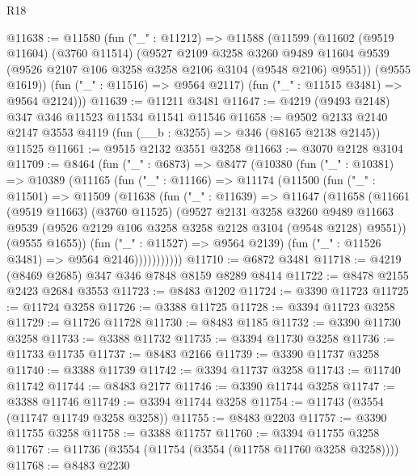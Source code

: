 \begin{lexlean}{R18}
\begin{coremodule}
@11638 := @11580
    (fun ("_" : @11212) =>
    @11588
      (@11599
        (@11602
          (@9519 @11604)
          (@3760 @11514)
          (@9527
            @2109
            @3258
            @3260
            @9489
            @11604
            @9539
            (@9526 @2107 @106 @3258 @3258 @2106 @3104 (@9548 @2106) @9551))
          (@9555 @1619))
        (fun ("_" : @11516) => @9564 @2117)
        (fun ("_" : @11515 @3481) => @9564 @2124)))
@11639 := @11211 @3481
@11647 := @4219 (@9493 @2148) @347 @346 @11523 @11534 @11541 @11546
@11658 := @9502 @2133 @2140 @2147 @3553 @4119 (fun (__b : @3255) => @346 (@8165 @2138 @2145)) @11525
@11661 := @9515 @2132 @3551 @3258
@11663 := @3070 @2128 @3104
@11709 := @8464
    (fun ("_" : @6873) =>
    @8477
      (@10380
        (fun ("_" : @10381) =>
        @10389
          (@11165
            (fun ("_" : @11166) =>
            @11174
              (@11500
                (fun ("_" : @11501) =>
                @11509
                  (@11638
                    (fun ("_" : @11639) =>
                    @11647
                      (@11658
                        (@11661
                          (@9519 @11663)
                          (@3760 @11525)
                          (@9527
                            @2131
                            @3258
                            @3260
                            @9489
                            @11663
                            @9539
                            (@9526 @2129 @106 @3258 @3258 @2128 @3104 (@9548 @2128) @9551))
                          (@9555 @1655))
                        (fun ("_" : @11527) => @9564 @2139)
                        (fun ("_" : @11526 @3481) => @9564 @2146)))))))))))
@11710 := @6872 @3481
@11718 := @4219 (@8469 @2685) @347 @346 @7848 @8159 @8289 @8414
@11722 := @8478 @2155 @2423 @2684 @3553
@11723 := @8483 @1202
@11724 := @3390 @11723
@11725 := @11724 @3258
@11726 := @3388 @11725
@11728 := @3394 @11723 @3258
@11729 := @11726 @11728
@11730 := @8483 @1185
@11732 := @3390 @11730 @3258
@11733 := @3388 @11732
@11735 := @3394 @11730 @3258
@11736 := @11733 @11735
@11737 := @8483 @2166
@11739 := @3390 @11737 @3258
@11740 := @3388 @11739
@11742 := @3394 @11737 @3258
@11743 := @11740 @11742
@11744 := @8483 @2177
@11746 := @3390 @11744 @3258
@11747 := @3388 @11746
@11749 := @3394 @11744 @3258
@11754 := @11743 (@3554 (@11747 @11749 @3258 @3258))
@11755 := @8483 @2203
@11757 := @3390 @11755 @3258
@11758 := @3388 @11757
@11760 := @3394 @11755 @3258
@11767 := @11736 (@3554 (@11754 (@3554 (@11758 @11760 @3258 @3258))))
@11768 := @8483 @2230

\end{coremodule}
\end{lexlean}
